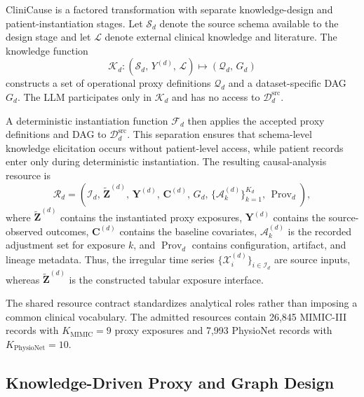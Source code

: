 \documentclass[letterpaper]{article}
\begin{document}
CliniCause is a factored transformation with separate knowledge-design and
patient-instantiation stages. Let \(\mathcal{S}_d\) denote the source schema
available to the design stage and let \(\mathcal{L}\) denote external clinical
knowledge and literature. The knowledge function
\[
\mathcal{K}_d:
\left(
  \mathcal{S}_d,\,
  Y^{(d)},\,
  \mathcal{L}
\right)
\longmapsto
\left(
  \mathcal{Q}_d,\,
  G_d
\right)
\]
constructs a set of operational proxy definitions
\(\mathcal{Q}_d\) and a dataset-specific DAG \(G_d\). The LLM participates only
in \(\mathcal{K}_d\) and has no access to
\(\mathcal{D}^{\mathrm{src}}_d\).

A deterministic instantiation function \(\mathcal{F}_d\) then applies the
accepted proxy definitions and DAG to
\(\mathcal{D}^{\mathrm{src}}_d\). This separation ensures that schema-level knowledge elicitation occurs without patient-level access, while patient records enter only during deterministic instantiation. The resulting
causal-analysis resource is
\[
\mathcal{R}_d=
\left(
  \mathcal{I}_d,\,
  \widetilde{\mathbf{Z}}^{(d)},\,
  \mathbf{Y}^{(d)},\,
  \mathbf{C}^{(d)},\,
  G_d,\,
  \{\mathcal{A}^{(d)}_k\}_{k=1}^{K_d},\,
  \operatorname{Prov}_d
\right),
\]
where \(\widetilde{\mathbf{Z}}^{(d)}\) contains the instantiated proxy
exposures, \(\mathbf{Y}^{(d)}\) contains the source-observed outcomes,
\(\mathbf{C}^{(d)}\) contains the baseline covariates,
\(\mathcal{A}^{(d)}_k\) is the recorded adjustment set for exposure \(k\), and
\(\operatorname{Prov}_d\) contains configuration, artifact, and lineage
metadata. Thus, the irregular time series
\(\{\mathcal{X}^{(d)}_i\}_{i\in\mathcal{I}_d}\) are source inputs, whereas
\(\widetilde{\mathbf{Z}}^{(d)}\) is the constructed tabular exposure interface.

The shared resource contract standardizes analytical roles rather than imposing
a common clinical vocabulary. The admitted resources contain 26,845 MIMIC-III
records with \(K_{\mathrm{MIMIC}}=9\) proxy exposures and 7,993 PhysioNet
records with \(K_{\mathrm{PhysioNet}}=10\).



\subsection{Knowledge-Driven Proxy and Graph Design}
\end{document}

